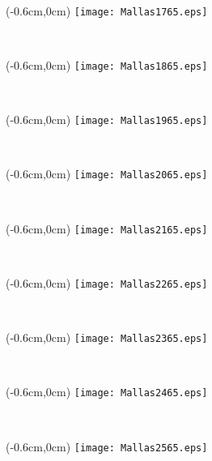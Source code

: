 \documentclass[12pt,letterpaper,oneside]{report}
\begin{document}
\ \pagebreak

\begin{textblock*}{\paperwidth}(-0.6cm,0cm)
\texttt{[image: Mallas1765.eps]}
\end{textblock*}

\ \pagebreak

\begin{textblock*}{\paperwidth}(-0.6cm,0cm)
\texttt{[image: Mallas1865.eps]}
\end{textblock*}

\ \pagebreak

\begin{textblock*}{\paperwidth}(-0.6cm,0cm)
\texttt{[image: Mallas1965.eps]}
\end{textblock*}

\ \pagebreak

\begin{textblock*}{\paperwidth}(-0.6cm,0cm)
\texttt{[image: Mallas2065.eps]}
\end{textblock*}

\ \pagebreak

\begin{textblock*}{\paperwidth}(-0.6cm,0cm)
\texttt{[image: Mallas2165.eps]}
\end{textblock*}

\ \pagebreak

\begin{textblock*}{\paperwidth}(-0.6cm,0cm)
\texttt{[image: Mallas2265.eps]}
\end{textblock*}

\ \pagebreak

\begin{textblock*}{\paperwidth}(-0.6cm,0cm)
\texttt{[image: Mallas2365.eps]}
\end{textblock*}

\ \pagebreak

\begin{textblock*}{\paperwidth}(-0.6cm,0cm)
\texttt{[image: Mallas2465.eps]}
\end{textblock*}

\ \pagebreak

\begin{textblock*}{\paperwidth}(-0.6cm,0cm)
\texttt{[image: Mallas2565.eps]}
\end{textblock*}
\end{document}
